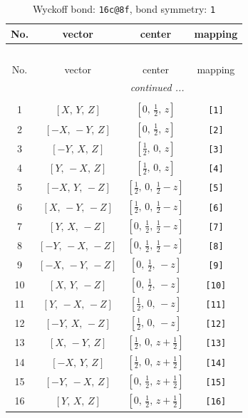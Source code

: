 \documentclass[fleqn,8pt]{jsarticle}
\begin{document}
\begin{longtable}{cccc}
\caption{Wyckoff bond: {\tt 16c@8f}, bond symmetry: {\tt 1}}
 \\
 \hline \hline
No. & vector & center & mapping \\ \hline \endfirsthead

\multicolumn{3}{l}{\tablename\ \thetable{}} \\
 \hline \hline
No. & vector & center & mapping \\ \hline \endhead

 \hline \hline
\multicolumn{3}{r}{\footnotesize\it continued ...} \\ \endfoot

 \hline \hline
\multicolumn{3}{r}{} \\ \endlastfoot

1 & $\left[ X,\, Y,\, Z \right]$ & $\left[ 0,\, \frac{1}{2},\, z \right]$ & {\tt [1]} \\ \hline
2 & $\left[ - X,\, - Y,\, Z \right]$ & $\left[ 0,\, \frac{1}{2},\, z \right]$ & {\tt [2]} \\ \hline
3 & $\left[ - Y,\, X,\, Z \right]$ & $\left[ \frac{1}{2},\, 0,\, z \right]$ & {\tt [3]} \\ \hline
4 & $\left[ Y,\, - X,\, Z \right]$ & $\left[ \frac{1}{2},\, 0,\, z \right]$ & {\tt [4]} \\ \hline
5 & $\left[ - X,\, Y,\, - Z \right]$ & $\left[ \frac{1}{2},\, 0,\, \frac{1}{2} - z \right]$ & {\tt [5]} \\ \hline
6 & $\left[ X,\, - Y,\, - Z \right]$ & $\left[ \frac{1}{2},\, 0,\, \frac{1}{2} - z \right]$ & {\tt [6]} \\ \hline
7 & $\left[ Y,\, X,\, - Z \right]$ & $\left[ 0,\, \frac{1}{2},\, \frac{1}{2} - z \right]$ & {\tt [7]} \\ \hline
8 & $\left[ - Y,\, - X,\, - Z \right]$ & $\left[ 0,\, \frac{1}{2},\, \frac{1}{2} - z \right]$ & {\tt [8]} \\ \hline
9 & $\left[ - X,\, - Y,\, - Z \right]$ & $\left[ 0,\, \frac{1}{2},\, - z \right]$ & {\tt [9]} \\ \hline
10 & $\left[ X,\, Y,\, - Z \right]$ & $\left[ 0,\, \frac{1}{2},\, - z \right]$ & {\tt [10]} \\ \hline
11 & $\left[ Y,\, - X,\, - Z \right]$ & $\left[ \frac{1}{2},\, 0,\, - z \right]$ & {\tt [11]} \\ \hline
12 & $\left[ - Y,\, X,\, - Z \right]$ & $\left[ \frac{1}{2},\, 0,\, - z \right]$ & {\tt [12]} \\ \hline
13 & $\left[ X,\, - Y,\, Z \right]$ & $\left[ \frac{1}{2},\, 0,\, z + \frac{1}{2} \right]$ & {\tt [13]} \\ \hline
14 & $\left[ - X,\, Y,\, Z \right]$ & $\left[ \frac{1}{2},\, 0,\, z + \frac{1}{2} \right]$ & {\tt [14]} \\ \hline
15 & $\left[ - Y,\, - X,\, Z \right]$ & $\left[ 0,\, \frac{1}{2},\, z + \frac{1}{2} \right]$ & {\tt [15]} \\ \hline
16 & $\left[ Y,\, X,\, Z \right]$ & $\left[ 0,\, \frac{1}{2},\, z + \frac{1}{2} \right]$ & {\tt [16]} \\
\end{longtable}
\end{document}
